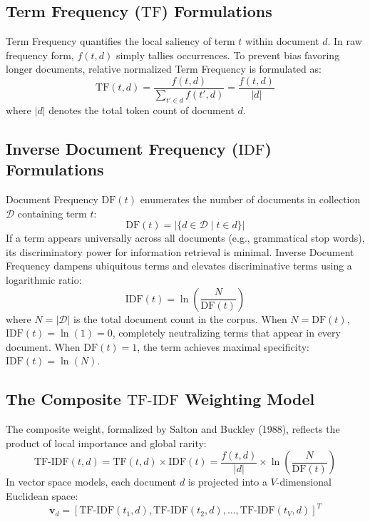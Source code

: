 \subsection{Term Frequency ($\text{TF}$) Formulations}
Term Frequency quantifies the local saliency of term $t$ within document $d$. In raw frequency form, $f(t, d)$ simply tallies occurrences. To prevent bias favoring longer documents, relative normalized Term Frequency is formulated as:
\begin{equation}
    \text{TF}(t, d) = \frac{f(t, d)}{\sum_{t' \in d} f(t', d)} = \frac{f(t, d)}{|d|}
\end{equation}
where $|d|$ denotes the total token count of document $d$.

\subsection{Inverse Document Frequency ($\text{IDF}$) Formulations}
Document Frequency $\text{DF}(t)$ enumerates the number of documents in collection $\mathcal{D}$ containing term $t$:
\begin{equation}
    \text{DF}(t) = |\{d \in \mathcal{D} \mid t \in d\}|
\end{equation}
If a term appears universally across all documents (e.g., grammatical stop words), its discriminatory power for information retrieval is minimal. Inverse Document Frequency dampens ubiquitous terms and elevates discriminative terms using a logarithmic ratio:
\begin{equation}
    \text{IDF}(t) = \ln\left(\frac{N}{\text{DF}(t)}\right)
\end{equation}
where $N = |\mathcal{D}|$ is the total document count in the corpus. When $N = \text{DF}(t)$, $\text{IDF}(t) = \ln(1) = 0$, completely neutralizing terms that appear in every document. When $\text{DF}(t) = 1$, the term achieves maximal specificity: $\text{IDF}(t) = \ln(N)$.

\subsection{The Composite $\text{TF-IDF}$ Weighting Model}
The composite weight, formalized by Salton and Buckley (1988), reflects the product of local importance and global rarity:
\begin{equation}
    \text{TF-IDF}(t, d) = \text{TF}(t, d) \times \text{IDF}(t) = \frac{f(t, d)}{|d|} \times \ln\left(\frac{N}{\text{DF}(t)}\right)
\end{equation}
In vector space models, each document $d$ is projected into a $V$-dimensional Euclidean space:
\begin{equation}
    \mathbf{v}_d = [\text{TF-IDF}(t_1, d), \text{TF-IDF}(t_2, d), \dots, \text{TF-IDF}(t_V, d)]^T
\end{equation}

